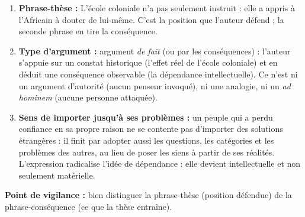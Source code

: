 \documentclass[11pt]{article}
\begin{document}
\begin{exoresolu}
\begin{enumerate}
\item \textbf{Phrase-thèse :} \og L'école coloniale n'a pas seulement instruit : elle a appris à l'Africain à douter de lui-même. \fg C'est la position que l'auteur défend ; la seconde phrase en tire la conséquence.
\item \textbf{Type d'argument :} argument \emph{de fait} (ou par les conséquences) : l'auteur s'appuie sur un constat historique (l'effet réel de l'école coloniale) et en déduit une conséquence observable (la dépendance intellectuelle). Ce n'est ni un argument d'autorité (aucun penseur invoqué), ni une analogie, ni un \emph{ad hominem} (aucune personne attaquée).
\item \textbf{Sens de \og importer jusqu'à ses problèmes \fg :} un peuple qui a perdu confiance en sa propre raison ne se contente pas d'importer des solutions étrangères : il finit par adopter aussi les questions, les catégories et les problèmes des autres, au lieu de poser les siens à partir de ses réalités. L'expression radicalise l'idée de dépendance : elle devient intellectuelle et non seulement matérielle.
\end{enumerate}
\textbf{Point de vigilance :} bien distinguer la phrase-thèse (position défendue) de la phrase-conséquence (ce que la thèse entraîne).
\end{exoresolu}
\end{document}
